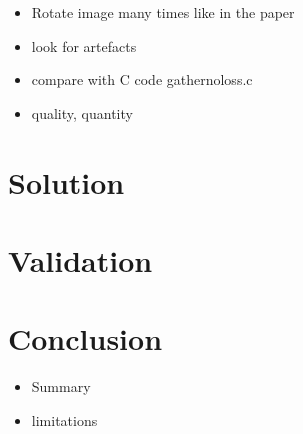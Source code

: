 \documentclass[]{usiinfbachelorproject}
\begin{document}
	
	\begin{itemize}
		\item Rotate image many times like in the paper
		\item look for artefacts
		\item compare with C code gathernoloss.c
		\item quality, quantity
	\end{itemize}
	
	
	\section{Solution}
	\section{Validation}
	\section{Conclusion}
	\begin{itemize}
		\item Summary
		\item limitations
	\end{itemize}
		\fi
	
	
	
	
\end{document}
